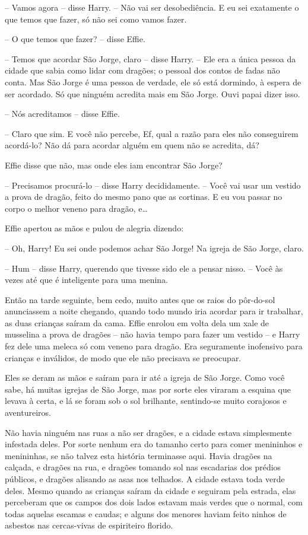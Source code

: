 -- Vamos agora -- disse Harry. -- Não vai ser desobediência. E eu sei
exatamente o que temos que fazer, só não sei como vamos fazer.

-- O que temos que fazer? -- disse Effie.

-- Temos que acordar São Jorge, claro -- disse Harry. -- Ele era a única
pessoa da cidade que sabia como lidar com dragões; o pessoal dos
contos de fadas não conta. Mas São Jorge é uma pessoa de verdade, ele
só está dormindo, à espera de ser acordado. Só que ninguém acredita
mais em São Jorge. Ouvi papai dizer isso.

-- Nós acreditamos -- disse Effie.

-- Claro que sim. E você não percebe, Ef, qual a razão para eles não
conseguirem acordá-lo? Não dá para acordar alguém em quem não se
acredita, dá?

Effie disse que não, mas onde eles iam encontrar São Jorge?

-- Precisamos procurá-lo -- disse Harry decididamente. -- Você vai usar
um vestido a prova de dragão, feito do mesmo pano que as cortinas. E
eu vou passar no corpo o melhor veneno para dragão, e…

Effie apertou as mãos e pulou de alegria dizendo:

-- Oh, Harry! Eu sei onde podemos achar São Jorge! Na igreja de São
Jorge, claro.

-- Hum -- disse Harry, querendo que tivesse sido ele a pensar nisso. --
Você às vezes até que é inteligente para uma menina.

Então na tarde seguinte, bem cedo, muito antes que os raios do
pôr-do-sol anunciassem a noite chegando, quando todo mundo iria
acordar para ir trabalhar, as duas crianças saíram da cama. Effie
enrolou em volta dela um xale de musselina a prova de dragões -- não
havia tempo para fazer um vestido -- e Harry fez dele uma meleca só
com veneno para dragão. Era seguramente inofensivo para crianças e
inválidos, de modo que ele não precisava se preocupar.

Eles se deram as mãos e saíram para ir até a igreja de São Jorge. Como
você sabe, há muitas igrejas de São Jorge, mas por sorte eles viraram
a esquina que levava à certa, e lá se foram sob o sol brilhante,
sentindo-se muito corajosos e aventureiros.

Não havia ninguém nas ruas a não ser dragões, e a cidade estava
simplesmente infestada deles. Por sorte nenhum era do tamanho certo
para comer menininhos e menininhas, se não talvez esta história
terminasse aqui. Havia dragões na calçada, e dragões na rua, e
dragões tomando sol nas escadarias dos prédios públicos, e dragões
alisando as asas nos telhados. A cidade estava toda verde deles.
Mesmo quando as crianças saíram da cidade e seguiram pela estrada,
elas perceberam que os campos dos dois lados estavam mais verdes que
o normal, com todas aquelas escamas e caudas; e alguns dos menores
haviam feito ninhos de asbestos nas cercas-vivas de espiriteiro
florido.

